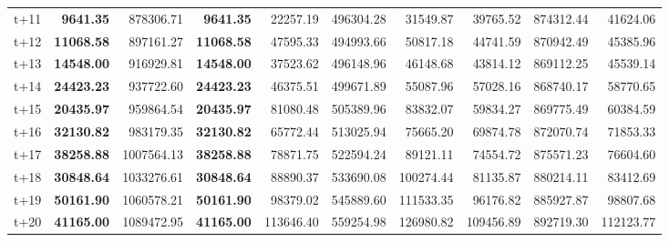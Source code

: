 \begin{table}[H]
\begin{tabular}{lrrrrrrrrr}
t+11  & \textbf{9641.35}  & 878306.71  & \textbf{9641.35}  & 22257.19  & 496304.28  & 31549.87  & 39765.52  & 874312.44  & 41624.06  \\
t+12  & \textbf{11068.58}  & 897161.27  & \textbf{11068.58}  & 47595.33  & 494993.66  & 50817.18  & 44741.59  & 870942.49  & 45385.96  \\
t+13  & \textbf{14548.00}  & 916929.81  & \textbf{14548.00}  & 37523.62  & 496148.96  & 46148.68  & 43814.12  & 869112.25  & 45539.14  \\
t+14  & \textbf{24423.23}  & 937722.60  & \textbf{24423.23}  & 46375.51  & 499671.89  & 55087.96  & 57028.16  & 868740.17  & 58770.65  \\
t+15  & \textbf{20435.97}  & 959864.54  & \textbf{20435.97}  & 81080.48  & 505389.96  & 83832.07  & 59834.27  & 869775.49  & 60384.59  \\
t+16  & \textbf{32130.82}  & 983179.35  & \textbf{32130.82}  & 65772.44  & 513025.94  & 75665.20  & 69874.78  & 872070.74  & 71853.33  \\
t+17  & \textbf{38258.88}  & 1007564.13  & \textbf{38258.88}  & 78871.75  & 522594.24  & 89121.11  & 74554.72  & 875571.23  & 76604.60  \\
t+18  & \textbf{30848.64}  & 1033276.61  & \textbf{30848.64}  & 88890.37  & 533690.08  & 100274.44  & 81135.87  & 880214.11  & 83412.69  \\
t+19  & \textbf{50161.90}  & 1060578.21  & \textbf{50161.90}  & 98379.02  & 545889.60  & 111533.35  & 96176.82  & 885927.87  & 98807.68  \\
t+20  & \textbf{41165.00}  & 1089472.95  & \textbf{41165.00}  & 113646.40  & 559254.98  & 126980.82  & 109456.89  & 892719.30  & 112123.77  \\

\bottomrule
\end{tabular}
\end{table}
